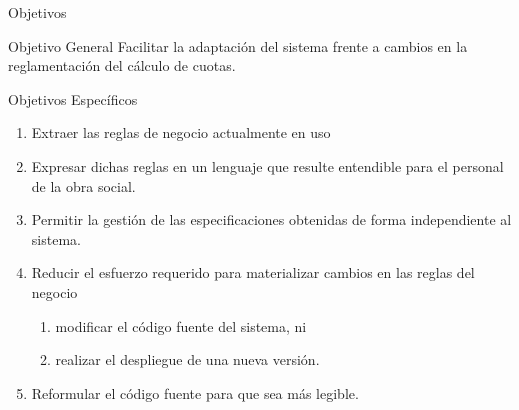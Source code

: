 \documentclass[10pt]{beamer}
\begin{document}
\begin{frame}{Objetivos}
    \begin{block}{Objetivo General}
        Facilitar la adaptación del sistema frente a cambios en la reglamentación del cálculo de cuotas.
    \end{block}
    \begin{block}{Objetivos Específicos}
        \begin{enumerate}
            \item Extraer las reglas de negocio actualmente en uso
            \item Expresar dichas reglas en un lenguaje que resulte entendible para el personal de la obra social.
            \item Permitir la gestión de las especificaciones obtenidas de forma independiente al sistema.
            \item Reducir el esfuerzo requerido para materializar cambios en las reglas del negocio
            \begin{enumerate}
                \item modificar el código fuente del sistema, ni
                \item realizar el despliegue de una nueva versión.
            \end{enumerate}
            \item Reformular el código fuente para que sea más legible.
        \end{enumerate}
    \end{block}
\end{frame}
\end{document}
